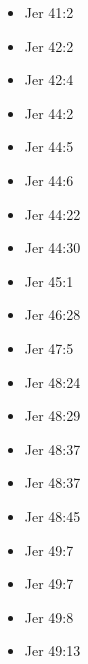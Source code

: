 \documentclass[14pt]{book}
\begin{document}
\begin{multicols}{2}
\begin{itemize}
								\item Jer 41:2
								
								\item Jer 42:2
								
								\item Jer 42:4
								
								\item Jer 44:2
								
								\item Jer 44:5
								
								\item Jer 44:6
								
								\item Jer 44:22
								
								\item Jer 44:30
								
								\item Jer 45:1
								
								\item Jer 46:28
								
								\item Jer 47:5
								
								\item Jer 48:24
								
								\item Jer 48:29
								
								\item Jer 48:37
								
								\item Jer 48:37
								
								\item Jer 48:45
								
								\item Jer 49:7
								
								\item Jer 49:7
								
								\item Jer 49:8
								
								\item Jer 49:13
								

\end{itemize}
\end{multicols}
\end{document}
